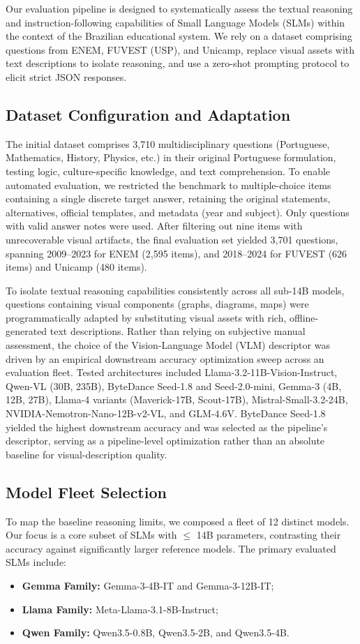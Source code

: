 \documentclass[12pt]{article}
\begin{document}
Our evaluation pipeline is designed to systematically assess the textual reasoning and instruction-following capabilities of Small Language Models (SLMs) within the context of the Brazilian educational system. We rely on a dataset comprising questions from ENEM, FUVEST (USP), and Unicamp, replace visual assets with text descriptions to isolate reasoning, and use a zero-shot prompting protocol to elicit strict JSON responses.

\subsection{Dataset Configuration and Adaptation}
The initial dataset comprises 3,710 multidisciplinary questions (Portuguese, Mathematics, History, Physics, etc.) in their original Portuguese formulation, testing logic, culture-specific knowledge, and text comprehension. To enable automated evaluation, we restricted the benchmark to multiple-choice items containing a single discrete target answer, retaining the original statements, alternatives, official templates, and metadata (year and subject). Only questions with valid answer notes were used. After filtering out nine items with unrecoverable visual artifacts, the final evaluation set yielded 3,701 questions, spanning 2009--2023 for ENEM (2,595 items), and 2018--2024 for FUVEST (626 items) and Unicamp (480 items).

To isolate textual reasoning capabilities consistently across all sub-14B models, questions containing visual components (graphs, diagrams, maps) were programmatically adapted by substituting visual assets with rich, offline-generated text descriptions. Rather than relying on subjective manual assessment, the choice of the Vision-Language Model (VLM) descriptor was driven by an empirical downstream accuracy optimization sweep across an evaluation fleet. Tested architectures included Llama-3.2-11B-Vision-Instruct, Qwen-VL (30B, 235B), ByteDance Seed-1.8 and Seed-2.0-mini, Gemma-3 (4B, 12B, 27B), Llama-4 variants (Maverick-17B, Scout-17B), Mistral-Small-3.2-24B, NVIDIA-Nemotron-Nano-12B-v2-VL, and GLM-4.6V. ByteDance Seed-1.8 yielded the highest downstream accuracy and was selected as the pipeline's descriptor, serving as a pipeline-level optimization rather than an absolute baseline for visual-description quality.

\subsection{Model Fleet Selection}
To map the baseline reasoning limits, we composed a fleet of 12 distinct models. Our focus is a core subset of SLMs with $\le$ 14B parameters, contrasting their accuracy against significantly larger reference models.
The primary evaluated SLMs include:
\begin{itemize}
    \item \textbf{Gemma Family:} Gemma-3-4B-IT and Gemma-3-12B-IT;
    \item \textbf{Llama Family:} Meta-Llama-3.1-8B-Instruct;
    \item \textbf{Qwen Family:} Qwen3.5-0.8B, Qwen3.5-2B, and Qwen3.5-4B.
\end{itemize}
\end{document}
